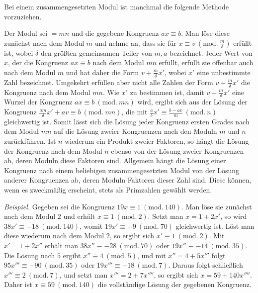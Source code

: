 \enlargethispage{2pt}

Bei einem zusammengesetzten Modul ist manchmal die folgende Methode vorzuziehen.

Der Modul sei $=mn$ und die gegebene Kongruenz $ax\equiv b$. Man löse diese zunächst nach dem Modul $m$ und nehme an, dass sie für $x\equiv v \ (\mathrm{mod.}\ \frac{m}{\delta})$ erfüllt ist, wobei $\delta$ den größten gemeinsamen Teiler von $m,a$ bezeichnet. Jeder Wert von $x$, der die Kongruenz $ax\equiv b$ nach dem Modul $mn$ erfüllt, erfüllt sie offenbar auch nach dem Modul $m$ und hat daher die Form $v+\frac{m}{\delta}x'$, wobei $x'$ eine unbestimmte Zahl bezeichnet. Umgekehrt erfüllen aber nicht alle Zahlen der Form $v+\frac{m}{\delta}x'$ die Kongruenz nach dem Modul $mn$. Wie $x'$ zu bestimmen ist, damit $v+\frac{m}{\delta}x'$ eine Wurzel der Kongruenz $ax\equiv b \ (\mathrm{mod.}\ mn)$ wird, ergibt sich aus der Lösung der Kongruenz $\frac{am}{\delta}x'+av\equiv b\ (\mathrm{mod.}\ mn)$, die mit $\frac{a}{\delta}x'\equiv\frac{b-av}{m}\ (\mathrm{mod.}\ n)$ gleichwertig ist. Somit lässt sich die Lösung jeder Kongruenz ersten Grades nach dem Modul $mn$ auf die Lösung zweier Kongruenzen nach den Moduln $m$ und $n$ zurückführen. Ist $n$ wiederum ein Produkt zweier Faktoren, so hängt die Lösung der Kongruenz nach dem Modul $n$ ebenso von der Lösung zweier Kongruenzen ab, deren Moduln diese Faktoren sind. Allgemein hängt die Lösung einer Kongruenz nach einem beliebigen zusammengesetzten Modul von der Lösung anderer Kongruenzen ab, deren Moduln Faktoren dieser Zahl sind. Diese können, wenn es zweckmäßig erscheint, stets als Primzahlen gewählt werden.

\emph{Beispiel.} Gegeben sei die Kongruenz $19x\equiv 1 \ (\mathrm{mod.}\ 140)$. Man löse sie zunächst nach dem Modul $2$ und erhält $x\equiv 1\ (\mathrm{mod.}\ 2)$. Setzt man $x=1+2x'$, so wird $38x'\equiv -18\ (\mathrm{mod.}\ 140)$, womit $19x'\equiv -9\ (\mathrm{mod.}\ 70)$ gleichwertig ist. Löst man diese
wiederum nach dem Modul $2$, so ergibt sich $x'\equiv 1\ (\mathrm{mod.}\ 2)$. Mit $x'=1+2x''$ erhält man $38x''\equiv -28\ (\mathrm{mod.}\ 70)$ oder $19x''\equiv -14\ (\mathrm{mod.}\ 35)$. Die Lösung nach $5$ ergibt $x''\equiv 4\ (\mathrm{mod.}\ 5)$, und mit $x''=4+5x'''$ folgt $95x'''\equiv -90\ (\mathrm{mod.}\ 35)$ oder $19x'''\equiv -18\ (\mathrm{mod.}\ 7)$. Daraus folgt schließlich $x'''\equiv 2\ (\mathrm{mod.}\ 7)$, und setzt man $x'''=2+7x''''$, so ergibt sich $x=59+140x''''$. Daher ist $x\equiv 59\ (\mathrm{mod.}\ 140)$ die vollständige Lösung der gegebenen Kongruenz.

